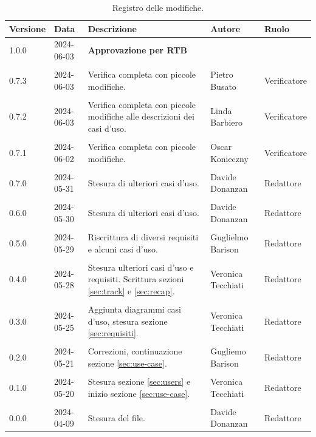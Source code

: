 \documentclass[8pt]{article}
\begin{document}
\begin{table}[ht!]
\hypersetup{hidelinks}
	\centering
	\begin{tabular}{p{1.2cm} p{2cm} p{6cm} p{3cm} p{2cm}}
		\toprule
		\textbf{Versione}& \textbf{Data} & \textbf{Descrizione} & \textbf{Autore} & \textbf{Ruolo} \\
		\midrule
  		    1.0.0 & 2024-06-03 & \textbf{Approvazione per RTB} & & \\\\
            0.7.3 & 2024-06-03 & Verifica completa con piccole modifiche. & Pietro Busato & Verificatore \\\\
            0.7.2 & 2024-06-03 & Verifica completa con piccole modifiche alle descrizioni dei casi d'uso. & Linda Barbiero & Verificatore \\\\
            0.7.1 & 2024-06-02 & Verifica completa con piccole modifiche. & Oscar Konieczny & Verificatore \\\\
         	0.7.0 & 2024-05-31 & Stesura di ulteriori casi d'uso. & Davide Donanzan & Redattore \\\\
         	0.6.0 & 2024-05-30 & Stesura di ulteriori casi d'uso. & Davide Donanzan & Redattore \\\\
         	0.5.0 & 2024-05-29 & Riscrittura di diversi requisiti e alcuni casi d'uso. & Guglielmo Barison & Redattore \\\\
            0.4.0 & 2024-05-28 & Stesura ulteriori casi d'uso e requisiti. Scrittura sezioni \ref{sec:track} e \ref{sec:recap}. & Veronica Tecchiati & Redattore \\\\
            0.3.0 & 2024-05-25 & Aggiunta diagrammi casi d'uso, stesura sezione \ref{sec:requisiti}. & Veronica Tecchiati & Redattore \\\\
            0.2.0 & 2024-05-21 & Correzioni, continuazione sezione \ref{sec:use-case}. & Gugliemo Barison & Redattore \\\\
            0.1.0 & 2024-05-20 & Stesura sezione \ref{sec:users} e inizio sezione \ref{sec:use-case}. & Veronica Tecchiati & Redattore \\\\
		    0.0.0 & 2024-04-09 & Stesura del file. & Davide Donanzan & Redattore \\
		\bottomrule
	\end{tabular}
	\caption{Registro delle modifiche.}
	\label{table:Registro delle modifiche}
\end{table}
\newpage
{\hypersetup{hidelinks} \tableofcontents}
\clearpage
\newpage
{\hypersetup{hidelinks} \listoffigures}
\newpage
{\hypersetup{hidelinks} \listoftables}
\newpage
\justifying
\end{document}
